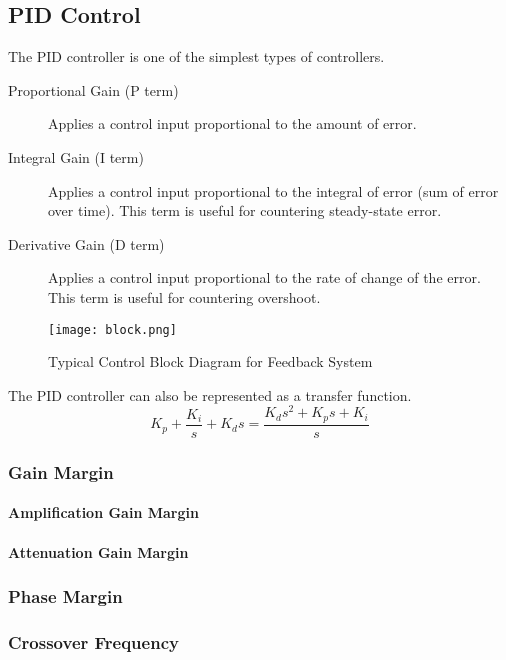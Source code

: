 \documentclass[../notes.tex]{subfiles}
\begin{document}
\subsection{PID Control}
The PID controller is one of the simplest types of controllers.
\begin{description}
    \item[Proportional Gain (P term)] Applies a control input proportional to the amount of error.
    \item[Integral Gain (I term)] Applies a control input proportional to the integral of error (sum of error over time). This term is useful for countering steady-state error.
    \item[Derivative Gain (D term)] Applies a control input proportional to the rate of change of the error. This term is useful for countering overshoot.
\end{description}

\begin{figure}[H]
    \centering
    \texttt{[image: block.png]}
    \caption{Typical Control Block Diagram for Feedback System}
    \label{fig:typicalBlock}
\end{figure}

The PID controller can also be represented as a transfer function.
\begin{equation} \label{eq:PIDTF}
    K_p + \frac{K_i}{s} + K_d s = \frac{K_ds^2 + K_ps + K_i}{s}
\end{equation}

\subsubsection{Gain Margin}
\paragraph{Amplification Gain Margin}
\paragraph{Attenuation Gain Margin}

\subsubsection{Phase Margin}

\subsubsection{Crossover Frequency}
\end{document}
